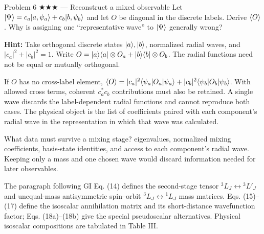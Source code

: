 \documentclass[11pt]{article}
\begin{document}
\begin{problem}{Problem 6 ★★★ — Reconstruct a mixed observable}
Let $\lvert \Psi\rangle=c_a\lvert a,\psi_a\rangle+c_b\lvert b,\psi_b\rangle$ and let $O$ be diagonal in
the discrete labels. Derive $\left\langle O\right\rangle$. Why is assigning one ``representative
wave'' to $\lvert \Psi\rangle$ generally wrong?

\textbf{Hint:} Take orthogonal discrete states $\lvert a\rangle,\lvert b\rangle$,
normalized radial waves, and $|c_a|^2+|c_b|^2=1$.
Write $O=\lvert a\rangle\langle a\rvert\otimes O_a+\lvert b\rangle\langle b\rvert\otimes O_b$.
The radial functions need not be equal or mutually orthogonal.
\end{problem}
\begin{solution}
If $O$ has no cross-label element,
$\left\langle O\right\rangle=|c_a|^2\langle \psi_a\rvert O_a\lvert \psi_a\rangle
+|c_b|^2\langle \psi_b\rvert O_b\lvert \psi_b\rangle$. With allowed cross terms, coherent
$c_a^*c_b$ contributions must also be retained. A single wave discards the
label-dependent radial functions and cannot reproduce both cases. The physical
object is the list of coefficients paired with each component's radial wave in
the representation in which that wave was calculated.
\end{solution}
\begin{quiz}
What data must survive a mixing stage? \answer eigenvalues, normalized mixing
coefficients, basis-state identities, and access to each component's radial
wave. Keeping only a mass and one chosen wave would discard information needed
for later observables.
\end{quiz}

\begin{paperbridge}
The paragraph following GI Eq. (14) defines the second-stage tensor
$^3L_J\leftrightarrow{}^3L'_J$ and unequal-mass antisymmetric spin--orbit
$^3L_J\leftrightarrow{}^1L_J$ mass matrices. Eqs. (15)--(17) define the
isoscalar annihilation matrix and its short-distance wavefunction factor;
Eqs. (18a)--(18b) give the special pseudoscalar alternatives. Physical
isoscalar compositions are tabulated in Table III.
\end{paperbridge}
\end{document}
